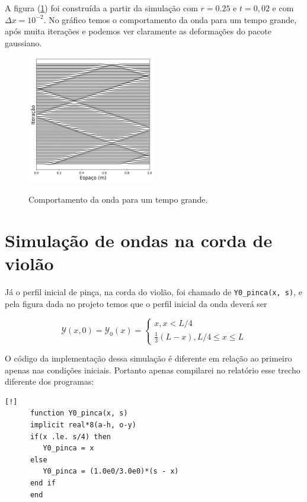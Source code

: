 \documentclass[a4paper, 11pt]{article}
\begin{document}
A figura (\ref{fig:tarefa1-c2}) foi construída a partir da simulação com \( r = 0.25 \) e \( t = 0,02
\) e com \( \Delta x = 10^{-2}\). No gráfico temos o comportamento da onda para um tempo grande, após muita iterações e podemos
ver claramente as deformações do pacote gaussiano.

\begin{figure}[h!] 
    \centering
    \caption{Comportamento da onda para um tempo grande.}
    \includegraphics[width=0.50\textwidth]{graf-tarefa1-c2}
    \label{fig:tarefa1-c2}
\end{figure}

\clearpage
\section{Simulação de ondas na corda de violão}

Já o perfil inicial de pinça, na corda do violão, foi chamado de \verb|Y0_pinca(x, s)|, e pela
figura dada no projeto temos que o perfil inicial da onda deverá ser 

\begin{equation}
  \mathcal{Y}(x, 0) = \mathcal{Y}_0(x) = \begin{cases}
    x, x < L/4\\
    \frac{1}{3} \left( L - x \right), L/4 \leq x \leq L
  \end{cases}
  \label{eq:y_0_pinca}
\end{equation}


O código da implementação dessa simulação é diferente em relação ao primeiro apenas nas condições
iniciais. Portanto apenas compilarei no relatório esse trecho diferente dos programas:

\begin{verbatim}[!]
      function Y0_pinca(x, s)
      implicit real*8(a-h, o-y)
      if(x .le. s/4) then
         Y0_pinca = x
      else
         Y0_pinca = (1.0e0/3.0e0)*(s - x)
      end if
      end
\end{verbatim}
\end{document}
